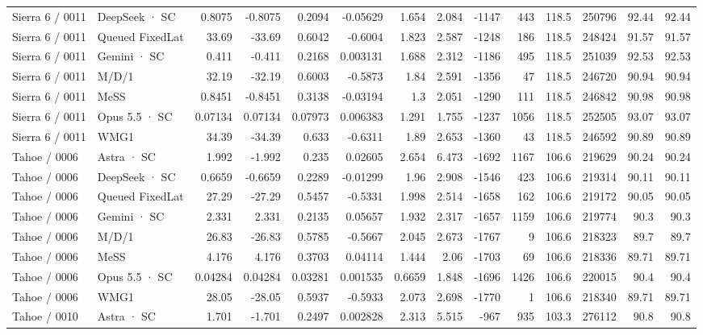 \begin{tabular}{llrrrrrrrrrrrr}
Sierra 6 / 0011 & DeepSeek · SC & 0.8075 & -0.8075 & 0.2094 & -0.05629 & 1.654 & 2.084 & -1147 & 443 & 118.5 & 250796 & 92.44 & 92.44 \\
Sierra 6 / 0011 & Queued FixedLat & 33.69 & -33.69 & 0.6042 & -0.6004 & 1.823 & 2.587 & -1248 & 186 & 118.5 & 248424 & 91.57 & 91.57 \\
Sierra 6 / 0011 & Gemini · SC & 0.411 & -0.411 & 0.2168 & 0.003131 & 1.688 & 2.312 & -1186 & 495 & 118.5 & 251039 & 92.53 & 92.53 \\
Sierra 6 / 0011 & M/D/1 & 32.19 & -32.19 & 0.6003 & -0.5873 & 1.84 & 2.591 & -1356 & 47 & 118.5 & 246720 & 90.94 & 90.94 \\
Sierra 6 / 0011 & MeSS & 0.8451 & -0.8451 & 0.3138 & -0.03194 & 1.3 & 2.051 & -1290 & 111 & 118.5 & 246842 & 90.98 & 90.98 \\
Sierra 6 / 0011 & Opus 5.5 · SC & 0.07134 & 0.07134 & 0.07973 & 0.006383 & 1.291 & 1.755 & -1237 & 1056 & 118.5 & 252505 & 93.07 & 93.07 \\
Sierra 6 / 0011 & WMG1 & 34.39 & -34.39 & 0.633 & -0.6311 & 1.89 & 2.653 & -1360 & 43 & 118.5 & 246592 & 90.89 & 90.89 \\
Tahoe / 0006 & Astra · SC & 1.992 & -1.992 & 0.235 & 0.02605 & 2.654 & 6.473 & -1692 & 1167 & 106.6 & 219629 & 90.24 & 90.24 \\
Tahoe / 0006 & DeepSeek · SC & 0.6659 & -0.6659 & 0.2289 & -0.01299 & 1.96 & 2.908 & -1546 & 423 & 106.6 & 219314 & 90.11 & 90.11 \\
Tahoe / 0006 & Queued FixedLat & 27.29 & -27.29 & 0.5457 & -0.5331 & 1.998 & 2.514 & -1658 & 162 & 106.6 & 219172 & 90.05 & 90.05 \\
Tahoe / 0006 & Gemini · SC & 2.331 & 2.331 & 0.2135 & 0.05657 & 1.932 & 2.317 & -1657 & 1159 & 106.6 & 219774 & 90.3 & 90.3 \\
Tahoe / 0006 & M/D/1 & 26.83 & -26.83 & 0.5785 & -0.5667 & 2.045 & 2.673 & -1767 & 9 & 106.6 & 218323 & 89.7 & 89.7 \\
Tahoe / 0006 & MeSS & 4.176 & 4.176 & 0.3703 & 0.04114 & 1.444 & 2.06 & -1703 & 69 & 106.6 & 218336 & 89.71 & 89.71 \\
Tahoe / 0006 & Opus 5.5 · SC & 0.04284 & 0.04284 & 0.03281 & 0.001535 & 0.6659 & 1.848 & -1696 & 1426 & 106.6 & 220015 & 90.4 & 90.4 \\
Tahoe / 0006 & WMG1 & 28.05 & -28.05 & 0.5937 & -0.5933 & 2.073 & 2.698 & -1770 & 1 & 106.6 & 218340 & 89.71 & 89.71 \\
Tahoe / 0010 & Astra · SC & 1.701 & -1.701 & 0.2497 & 0.002828 & 2.313 & 5.515 & -967 & 935 & 103.3 & 276112 & 90.8 & 90.8 \\

\end{tabular}
